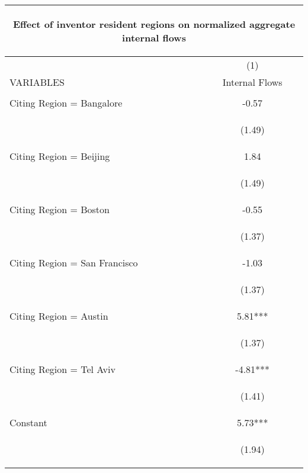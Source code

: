 \begin{center}
\begin{tabular}{lc}
\multicolumn{2}{c}{\begin{large}Effect of inventor resident regions on normalized aggregate internal flows \label{sinternal}\end{large}} \\ \hline
 & (1) \\
VARIABLES & Internal Flows \\ \hline
\vspace{4pt} & \begin{footnotesize}\end{footnotesize} \\
Citing Region = Bangalore & -0.57 \\
\vspace{4pt} & \begin{footnotesize}(1.49)\end{footnotesize} \\
Citing Region = Beijing & 1.84 \\
\vspace{4pt} & \begin{footnotesize}(1.49)\end{footnotesize} \\
Citing Region = Boston & -0.55 \\
\vspace{4pt} & \begin{footnotesize}(1.37)\end{footnotesize} \\
Citing Region = San Francisco & -1.03 \\
\vspace{4pt} & \begin{footnotesize}(1.37)\end{footnotesize} \\
Citing Region = Austin & 5.81*** \\
\vspace{4pt} & \begin{footnotesize}(1.37)\end{footnotesize} \\
Citing Region = Tel Aviv & -4.81*** \\
\vspace{4pt} & \begin{footnotesize}(1.41)\end{footnotesize} \\
Constant & 5.73*** \\
 & \begin{footnotesize}(1.94)\end{footnotesize} \\

\end{tabular}
\end{center}
